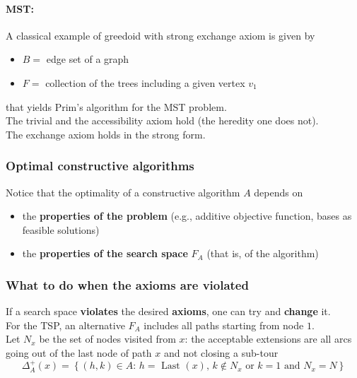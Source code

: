\documentclass[11pt]{article}
\begin{document}
	\paragraph{MST:} A classical example of greedoid with strong exchange axiom is given by
	\begin{itemize}
		\item $B =$ edge set of a graph
		\item $F =$ collection of the trees including a given vertex $v_1$
	\end{itemize}
	that yields Prim’s algorithm for the MST problem.\\
	
	The trivial and the accessibility axiom hold (the heredity one does not).\\
	The exchange axiom holds in the strong form.\\
	
	\vfill
	
	\subsubsection*{Optimal constructive algorithms}
	Notice that the optimality of a constructive algorithm $A$ depends on
	\begin{itemize}
		\item the \textbf{properties of the problem} (e.g., additive objective function, bases as feasible solutions)
		\item the \textbf{properties of the search space} $F_A$ (that is, of the algorithm)
	\end{itemize}
	
	
	\newpage
	
	\subsubsection{What to do when the axioms are violated}
	If a search space \textbf{violates} the desired \textbf{axioms}, one can try and \textbf{change} it.\\
	
	For the TSP, an alternative $F_A$ includes all paths starting from node $1$.\\
	Let $N_x$ be the set of nodes visited from $x$: the acceptable extensions are all arcs going out of the last node of path $x$ and not closing a sub-tour
	$$ \Delta_A^+ (x) = \left\{(h,k) \in A : \, h = \text{ Last } (x), \, k \notin N_x \text{ or } k = 1 \text{ and } N_x = N \right\} $$
	
\end{document}
